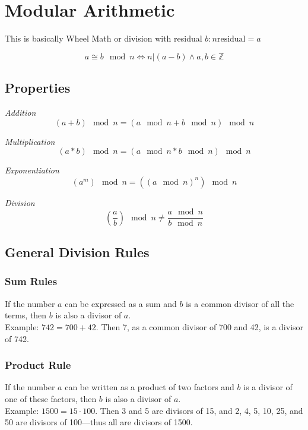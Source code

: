 \newpage
\section{Modular Arithmetic}

This is basically Wheel Math or division with residual \(b : n \text{residual} = a\)

\[a \cong b \mod n \iff n | (a - b) \land  a,b \in \mathbb{Z}\]

\subsection{Properties}

\emph{Addition}
\[(a + b) \mod n = (a \mod n + b \mod n) \mod n\]

\emph{Multiplication}
\[(a * b) \mod n = (a \mod n * b \mod n) \mod n\]

\emph{Exponentiation}
\[(a^m) \mod n = ({(a \mod n)}^n) \mod n\]

\emph{Division}
\[(\frac{a}{b}) \mod n \ne  \frac{a \mod n}{b \mod n}\]

\subsection{General Division Rules}

\subsubsection*{Sum Rules}

If the number \( a \) can be expressed as a sum and \( b \) is a common divisor of all the terms, then \( b \) is also a divisor of \( a \). \\
 Example: \( 742 = 700 + 42 \). Then 7, as a common divisor of 700 and 42, is a divisor of 742.

\subsubsection*{Product Rule}

If the number \( a \) can be written as a product of two factors and \( b \) is a divisor of one of these factors, then \( b \) is also a divisor of \( a \). \\
Example: \( 1500 = 15 \cdot 100 \). Then 3 and 5 are divisors of 15, and 2, 4, 5, 10, 25, and 50 are divisors of 100—thus all are divisors of 1500.



